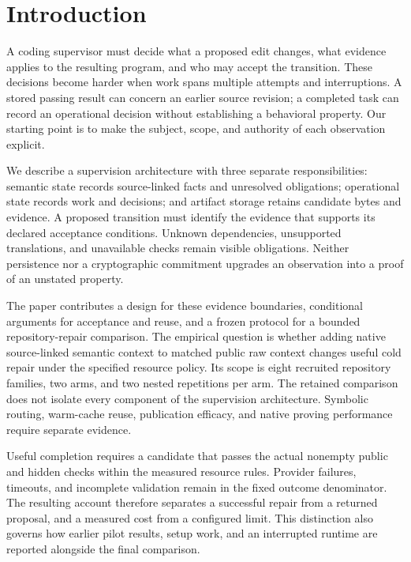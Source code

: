 \section{Introduction}

A coding supervisor must decide what a proposed edit changes, what evidence
applies to the resulting program, and who may accept the transition. These
decisions become harder when work spans multiple attempts and interruptions.
A stored passing result can concern an earlier source revision; a completed
task can record an operational decision without establishing a behavioral
property. Our starting point is to make the subject, scope, and authority of
each observation explicit.

We describe a supervision architecture with three separate responsibilities:
semantic state records source-linked facts and unresolved obligations;
operational state records work and decisions; and artifact storage retains
candidate bytes and evidence. A proposed transition must identify the evidence
that supports its declared acceptance conditions. Unknown dependencies,
unsupported translations, and unavailable checks remain visible obligations.
Neither persistence nor a cryptographic commitment upgrades an observation
into a proof of an unstated property.

The paper contributes a design for these evidence boundaries, conditional
arguments for acceptance and reuse, and a frozen protocol for a bounded
repository-repair comparison. The empirical question is whether adding native
source-linked semantic context to matched public raw context changes useful
cold repair under the specified resource policy. Its scope is eight recruited
repository families, two arms, and two nested repetitions per arm. The retained
comparison does not isolate every component of the supervision architecture.
Symbolic routing, warm-cache reuse, publication efficacy, and native proving
performance require separate evidence.

Useful completion requires a candidate that passes the actual nonempty public
and hidden checks within the measured resource rules. Provider failures,
timeouts, and incomplete validation remain in the fixed outcome denominator.
The resulting account therefore separates a successful repair from a returned
proposal, and a measured cost from a configured limit. This distinction also
governs how earlier pilot results, setup work, and an interrupted runtime are
reported alongside the final comparison.
